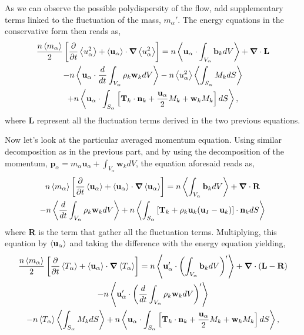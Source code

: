As we can observe the possible polydispersity of the flow, add supplementary terms linked to the fluctuation of the mass, $m_\alpha'$.
The energy equations in the conservative form then reads as, 
\begin{multline*}
    \frac{n \left<m_\alpha\right>}{2}
    \left[
        \frac{\partial }{\partial t}\left<u^2_\alpha\right>
        + 
        \left<\textbf{u}_\alpha\right>
        \cdot\bm{\nabla} 
        \left<u^2_\alpha\right>
    \right]
    = n \left<\textbf{u}_\alpha \cdot \int_{V_\alpha} \textbf{b}_k dV\right> + \bm{\nabla} \cdot \textbf{L}\\
    - n \left<\textbf{u}_\alpha \cdot \frac{d}{d t} \int_{V_\alpha} \rho_k \textbf{w}_k dV\right> 
    - n \left<u_\alpha^2\right>\left<\int_{S_\alpha} M_k d S\right>\\
    + n \left<\textbf{u}_\alpha \cdot \int_{S_\alpha} \left[
    \textbf{T}_k \cdot\textbf{n}_k
    +\frac{\textbf{u}_\alpha}{2} M_k
    +\textbf{w}_k M_k
    \right]dS\right>,
\end{multline*}
where \textbf{L} represent all the fluctuation terms derived in the two previous equations. 

Now let's look at the particular averaged momentum equation. 
Using similar decomposition as in the previous part,
and by using the decomposition of the momentum, $\textbf{p}_\alpha = m_\alpha \textbf{u}_\alpha + \int_{V_\alpha} \textbf{w}_k dV$, the equation aforesaid reads as, 
\begin{multline*}
    n \left<m_\alpha\right> \left[
        \frac{\partial}{\partial t} \left<\textbf{u}_\alpha\right>
        + \left<\textbf{u}_\alpha\right>\cdot\bm{\nabla}\left<\textbf{u}_\alpha\right>
    \right]
    = n \left<\int_{V_\alpha} \textbf{b}_k dV\right>
    + \bm{\nabla} \cdot \textbf{R}\\
    - n \left<\frac{d}{d t} \int_{V_\alpha} \rho_k \textbf{w}_k dV\right> 
    + n \left<\int_{S_\alpha} \left[\textbf{T}_k + \rho_k \textbf{u}_k (\textbf{u}_I-\textbf{u}_k) \right] \cdot \textbf{n}_k d S\right>
\end{multline*}
where \textbf{R} is the term that gather all the fluctuation terms. 
Multiplying, this equation by $\left<\textbf{u}_\alpha\right>$ and taking the difference with the energy equation yielding, 
\begin{multline*}
    \frac{n \left<m_\alpha\right>}{2}
    \left[
        \frac{\partial }{\partial t}\left<T_\alpha\right>
        + 
        \left<\textbf{u}_\alpha\right>
        \cdot\bm{\nabla} 
        \left<T_\alpha\right>
    \right]
    = n \left<\textbf{u}_\alpha' \cdot \left(\int_{V_\alpha} \textbf{b}_k dV\right)'\right> 
    + \bm{\nabla} \cdot \left(\textbf{L}-\textbf{R}\right)\\
    - n \left<\textbf{u}_\alpha' \cdot \left(\frac{d}{d t} \int_{V_\alpha} \rho_k \textbf{w}_k dV\right)'\right> \\
    - n \left<T_\alpha\right>\left<\int_{S_\alpha} M_k d S\right>
    + n \left<\textbf{u}_\alpha \cdot \int_{S_\alpha} \left[
    \textbf{T}_k \cdot\textbf{n}_k
    +\frac{\textbf{u}_\alpha}{2} M_k
    +\textbf{w}_k M_k
    \right]dS\right>,
\end{multline*}